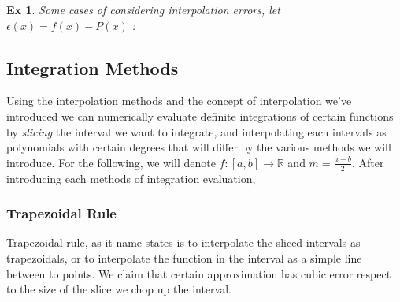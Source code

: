 \documentclass[paper=a4, fontsize=11pt]{scrartcl}
\newtheorem{example}{Ex}
\begin{document}
\begin{example}
Some cases of considering interpolation errors, let $\epsilon(x)=f(x)-P(x)$ :\\
\end{example}

\vspace{0.15in}
\subsection{Integration Methods}
\vspace{0.15in}

Using the interpolation methods and the concept of interpolation we've introduced we can numerically evaluate definite integrations of certain functions by \textit{slicing} the interval we want to integrate, and interpolating each intervals as polynomials with certain degrees that will differ by the various methods we will introduce. For the following, we will denote $f:[a,b]\to\mathbb{R}$ and $m=\frac{a+b}{2}$. After introducing each methods of integration evaluation, 

\vspace{0.15in}
\subsubsection{Trapezoidal Rule}
\vspace{0.15in}

Trapezoidal rule, as it name states is to interpolate the sliced intervals as trapezoidals, or to interpolate the function in the interval as a simple line between to points. We claim that certain approximation has cubic error respect to the size of the slice we chop up the interval.\\
\end{document}
